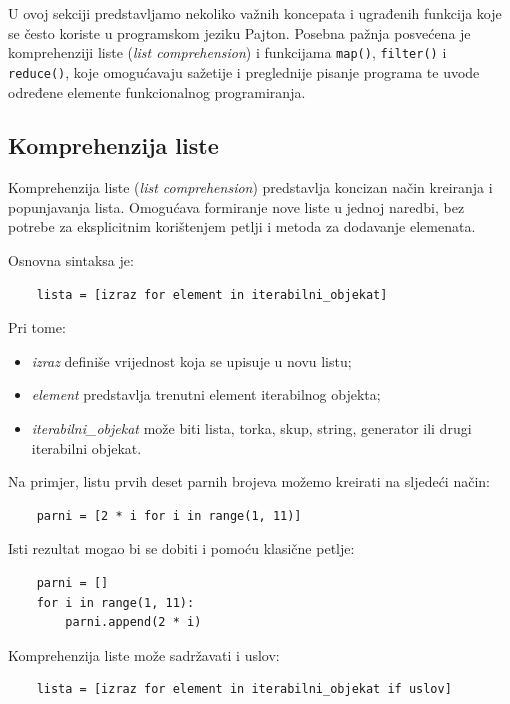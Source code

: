 U ovoj sekciji predstavljamo nekoliko važnih koncepata i ugrađenih funkcija koje se često koriste u programskom jeziku Pajton. Posebna pažnja posvećena je komprehenziji liste (\textit{list comprehension}) i funkcijama \texttt{map()}, \texttt{filter()} i \texttt{reduce()}, koje omogućavaju sažetije i preglednije pisanje programa te uvode određene elemente funkcionalnog programiranja.

\subsection{Komprehenzija liste}

Komprehenzija liste (\textit{list comprehension}) predstavlja koncizan način kreiranja i popunjavanja lista. Omogućava formiranje nove liste u jednoj naredbi, bez potrebe za eksplicitnim korištenjem petlji i metoda za dodavanje elemenata.

Osnovna sintaksa je:

\begin{verbatim}
	lista = [izraz for element in iterabilni_objekat]
\end{verbatim}

Pri tome:

\begin{itemize}
	\item \textit{izraz} definiše vrijednost koja se upisuje u novu listu;
	\item \textit{element} predstavlja trenutni element iterabilnog objekta;
	\item \textit{iterabilni\_objekat} može biti lista, torka, skup, string, generator ili drugi iterabilni objekat.
\end{itemize}

Na primjer, listu prvih deset parnih brojeva možemo kreirati na sljedeći način:

\begin{verbatim}
	parni = [2 * i for i in range(1, 11)]
\end{verbatim}

Isti rezultat mogao bi se dobiti i pomoću klasične petlje:

\begin{verbatim}
	parni = []
	for i in range(1, 11):
	    parni.append(2 * i)
\end{verbatim}

Komprehenzija liste može sadržavati i uslov:

\begin{verbatim}
	lista = [izraz for element in iterabilni_objekat if uslov]
\end{verbatim}


